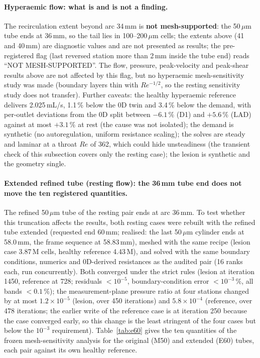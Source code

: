 \documentclass[11pt]{article}
\begin{document}
\paragraph{Hyperaemic flow: what is and is not a finding.} The recirculation extent beyond arc 34\,mm is \textbf{not mesh-supported}: the 50\,$\mu$m tube ends at 36\,mm, so the tail lies in 100--200\,$\mu$m cells; the extents above (41 and 40\,mm) are diagnostic values and are not presented as results; the pre-registered flag (last reversed station more than 2\,mm inside the tube end) reads ``NOT MESH-SUPPORTED''. The flow, pressure, peak-velocity and peak-shear results above are not affected by this flag, but no hyperaemic mesh-sensitivity study was made (boundary layers thin with $Re^{-1/2}$, so the resting sensitivity study does not transfer). Further caveats: the healthy hyperaemic reference delivers 2.025\,mL/s, 1.1\,\% below the 0D twin and 3.4\,\% below the demand, with per-outlet deviations from the 0D split between $-6.1\,\%$ (D1) and $+5.6\,\%$ (LAD) against at most $+3.1\,\%$ at rest (the cause was not isolated); the demand is synthetic (no autoregulation, uniform resistance scaling); the solves are steady and laminar at a throat $Re$ of 362, which could hide unsteadiness (the transient check of this subsection covers only the resting case); the lesion is synthetic and the geometry single.

\paragraph{Extended refined tube (resting flow): the 36\,mm tube end does not move the ten registered quantities.} The refined 50\,$\mu$m tube of the resting pair ends at arc 36\,mm. To test whether this truncation affects the results, both resting cases were rebuilt with the refined tube extended (requested end 60\,mm; realised: the last 50\,$\mu$m cylinder ends at 58.0\,mm, the frame sequence at 58.83\,mm), meshed with the same recipe (lesion case 3.87\,M cells, healthy reference 4.43\,M), and solved with the same boundary conditions, numerics and 0D-derived resistances as the audited pair (16 ranks each, run concurrently). Both converged under the strict rules (lesion at iteration 1450, reference at 728; residuals $<10^{-5}$, boundary-condition error $<10^{-3}\,\%$, all bands $<0.1\,\%$); the measurement-plane pressure ratio at four stations changed by at most $1.2\times10^{-5}$ (lesion, over 450 iterations) and $5.8\times10^{-4}$ (reference, over 478 iterations; the earlier write of the reference case is at iteration 250 because the case converged early, so this change is the least stringent of the four cases but below the $10^{-3}$ requirement). Table~\ref{tab:e60} gives the ten quantities of the frozen mesh-sensitivity analysis for the original (M50) and extended (E60) tubes, each pair against its own healthy reference.
\end{document}
